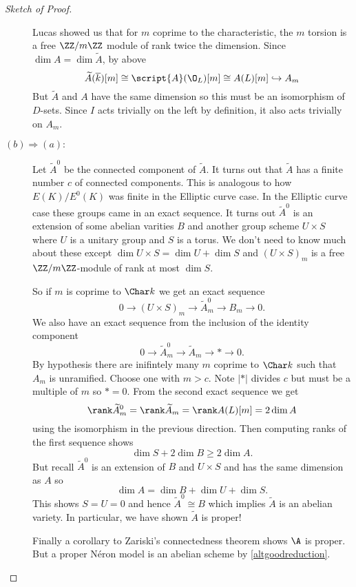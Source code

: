 \documentclass[11pt]{article}
\newcommand{\neron}{N\'{e}ron }
\begin{document}
\begin{proof}[Sketch of Proof]
\begin{description}
			Lucas showed us that for $m$ coprime to the characteristic, the $m$ torsion is a free $\ZZ/m\ZZ$ module of rank twice the dimension. Since $\dim A = \dim \tilde{A}$, by above
			$$
			\widetilde{A}(\overline{k})[m] \cong \script{A}(\O_L)[m] \cong A(L)[m] \hookrightarrow A_m
			$$
			But $\widetilde{A}$ and $A$ have the same dimension so this must be an isomorphism of $D$-sets. Since $I$ acts trivially on the left by definition, it also acts trivially on $A_m$.

		\item[$(b) \Rightarrow (a):$]
			
			Let $\widetilde{A}^0$ be the connected component of $\widetilde{A}$. It turns out that $\widetilde{A}$ has a finite number $c$ of connected components. This is analogous to how $E(K)/E^0(K)$ was finite in the Elliptic curve case. In the Elliptic curve case these groups came in an exact sequence. It turns out $\widetilde{A}^0$ is an extension of some abelian varities $B$ and another group scheme $U\times S$ where $U$ is a unitary group and $S$ is a torus. We don't need to know much about these except $\dim U\times S = \dim U + \dim S$ and $(U\times S)_m$ is a free $\ZZ/m\ZZ$-module of rank at most $\dim S$.
			
			So if $m$ is coprime to $\Char k$ we get an exact sequence
			$$
				0 \to (U\times S)_m \to \widetilde{A}_m^0 \to B_m \to 0.
			$$
			We also have an exact sequence from the inclusion of the identity component
			$$
				0 \to \widetilde{A}^0_m \to \widetilde{A}_m \to \ast \to 0.
			$$			
			By hypothesis there are inifintely many $m$ coprime to $\Char k$ such that $A_m$ is unramified. Choose one with $m > c$. Note $|\ast|$ divides $c$ but must be a multiple of $m$ so $\ast = 0$. From the second exact sequence we get
			$$
				\rank\widetilde{A}^0_m = \rank\widetilde{A}_m = \rank A(L)[m] = 2\dim A
			$$ using the isomorphism in the previous direction.
			Then computing ranks of the first sequence shows
			$$
				\dim S + 2\dim B \geq 2\dim A.
			$$
			But recall $\widetilde{A}^0$ is an extension of $B$ and $U\times S$ and has the same dimension as $A$ so
			$$
				\dim A = \dim B + \dim U + \dim S.
			$$
			This shows $S = U = 0$ and hence $\widetilde{A}^0 \cong B$ which implies $\widetilde{A}$ is an abelian variety. In particular, we have shown $\widetilde{A}$ is proper!
			
			Finally a corollary to Zariski's connectedness theorem shows $\A$ is proper. But a proper \neron model is an abelian scheme by \autoref{altgoodreduction}.
	\end{description}
\end{proof}
\end{document}
